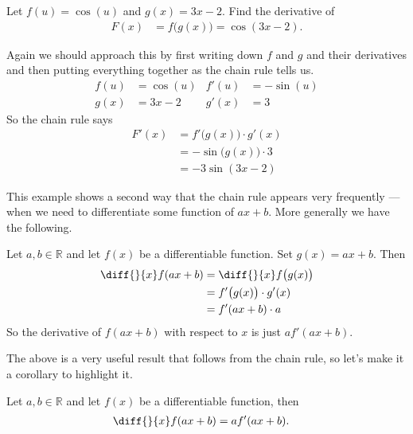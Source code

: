 \begin{eg}\label{eg_2_9_2}
  Let $f(u) = \cos(u)$ and $g(x) = 3x-2$. Find the derivative of
\begin{align*}
  F(x) &= f\big(g(x)\big) = \cos(3x-2).
\end{align*}

Again we should approach this by first writing down $f$ and $g$ and their
derivatives and then putting everything together as the chain rule tells us.
\begin{align*}
  f(u) &= \cos(u) & f'(u) &= -\sin(u) \\
  g(x) &= 3x-2 & g'(x) &= 3
\end{align*}
So the chain rule says
\begin{align*}
  F'(x) &= f'\big(g(x)\big) \cdot g'(x) \\
  &= -\sin\big( g(x) \big) \cdot 3 \\
  &= -3 \sin(3x-2)
\end{align*}
\end{eg}
\goodbreak

This example shows a second way that the chain rule appears
very frequently --- when we need to differentiate some function
of $ax+b$. More generally we have the following.
\begin{eg}
\label{eg:DIFFchainaxb}
  Let $a,b \in \mathbb{R}$ and let $f(x)$ be a differentiable function.
Set  $g(x) = ax+b$. Then
  \begin{align*}
  \diff{}{x} f(ax+b) &= \diff{}{x} f\big(g(x)\big) \\
  &= f'\big(g(x)\big) \cdot g'(x) \\
  &= f'(ax+b) \cdot a
\end{align*}
So the derivative of $f(ax+b)$ with respect to $x$ is just $a f'(ax+b)$.
\end{eg}
The above is a very useful result that follows from the chain rule, so let's make it a
corollary to highlight it.
\begin{cor}\label{cor f of axb}
  Let $a,b \in \mathbb{R}$ and let $f(x)$ be a differentiable function, then
\begin{align*}
  \diff{}{x} f(ax+b) &= af'(ax+b).
\end{align*}
\end{cor}



